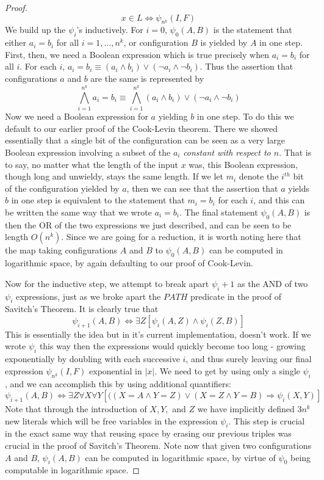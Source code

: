 \begin{proof}
    \[ x \in L \iff \psi_{n^k}(I,F) \]
    We build up the $\psi_i$'s inductively. For $i=0$, $\psi_0(A,B)$ is the statement that either $a_i = b_i$ for all $i=1,...,n^k$, or configuration $B$ is yielded by $A$ in one step. First, then, we need a Boolean expression which is true precisely when $a_i = b_i$ for all $i$. For each $i$, $a_i=b_i \equiv (a_i \wedge b_i) \vee (\neg a_i \wedge \neg b_i)$. Thus the assertion that configurations $a$ and $b$ are the same is represented by
    \[ \bigwedge_{i=1}^{n^k}a_i = b_i \equiv \bigwedge_{i=1}^{n^k}(a_i \wedge b_i) \vee (\neg a_i \wedge \neg b_i) \]
    Now we need a Boolean expression for $a$ yielding $b$ in one step. To do this we default to our earlier proof of the Cook-Levin theorem. There we showed essentially that a single bit of the configuration can be seen as a very large Boolean expression involving a subset of the $a_i$ \textit{constant with respect to $n$}. That is to say, no matter what the length of the input $x$ was, this Boolean expression, though long and unwieldy, stays the same length. If we let $m_i$ denote the $i^{th}$ bit of the configuration yielded by $a$, then we can see that the assertion that $a$ yields $b$ in one step is equivalent to the statement that $m_i = b_i$ for each $i$, and this can be written the same way that we wrote $a_i=b_i$. The final statement $\psi_0(A,B)$ is then the OR of the two expressions we just described, and can be seen to be length $O(n^k)$. Since we are going for a reduction, it is worth noting here that the map taking configurations $A$ and $B$ to $\psi_0(A,B)$ can be computed in logarithmic space, by again defaulting to our proof of Cook-Levin.
    \par Now for the inductive step, we attempt to break apart $\psi_i+1$ as the AND of two $\psi_i$ expressions, just as we broke apart the $PATH$ predicate in the proof of Savitch's Theorem. It is clearly true that
    \[ \psi_{i+1}(A,B) \iff \exists Z [\psi_i(A,Z) \wedge \psi_i(Z,B)] \]
    This is essentially the idea but in it's current implementation, doesn't work. If we wrote $\psi_i$ this way then the expressions would quickly become too long - growing exponentially by doubling with each successive $i$, and thus surely leaving our final expression $\psi_{n^k}(I,F)$ exponential in $|x|$. We need to get by using only a single $\psi_i$, and we can accomplish this by using additional quantifiers:
    \[  \psi_{i+1}(A,B) \iff \exists Z \forall X \forall Y [((X=A \wedge Y=Z) \vee (X = Z \wedge Y=B) \Rightarrow \psi_i(X,Y)] \]
    Note that through the introduction of $X,Y,$ and $Z$ we have implicitly defined $3n^k$ new literals which will be free variables in the expression $\psi_i$. This step is crucial in the exact same way that reusing space by erasing our previous triples was crucial in the proof of Savitch's Theorem. Note now that given two configurations $A$ and $B$, $\psi_i(A,B)$ can be computed in logarithmic space, by virtue of $\psi_0$ being computable in logarithmic space. 

\end{proof}
